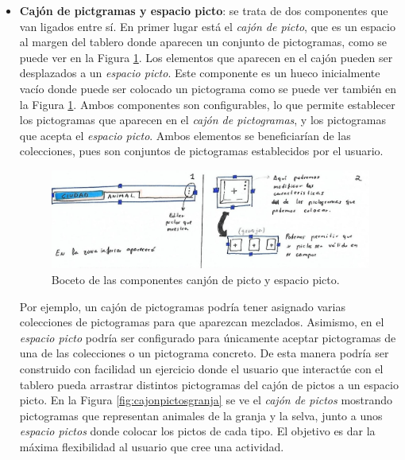 \begin{itemize}
	
	\item \textbf{Cajón de pictgramas y espacio picto}: se trata de dos componentes que van ligados entre sí. En primer lugar está el \textit{cajón de picto}, que es un espacio al margen del tablero donde aparecen un conjunto de pictogramas, como se puede ver en la Figura \ref{fig:componentecajon}. Los elementos que aparecen en el cajón pueden ser desplazados a un \textit{espacio picto}. Este componente es un hueco inicialmente vacío donde puede ser colocado un pictograma como se puede ver también en la Figura \ref{fig:componentecajon}. Ambos componentes son configurables, lo que permite establecer los pictogramas que aparecen en el \textit{cajón de pictogramas}, y los pictogramas que acepta el \textit{espacio picto}. Ambos elementos se beneficiarían de las colecciones, pues son conjuntos de pictogramas establecidos por el usuario.
	
	\begin{figure}[h!]
		\centering
		\includegraphics[width=0.7\linewidth]{Imagenes/Bitmap/componenteCajon}
		\caption{Boceto de las componentes canjón de picto y espacio picto.}
		\label{fig:componentecajon}
	\end{figure}
	
	
	Por ejemplo, un cajón de pictogramas podría tener asignado varias colecciones de pictogramas para que aparezcan mezclados. Asimismo, en el \textit{espacio picto} podría ser configurado para únicamente aceptar pictogramas de una de las colecciones o un pictograma concreto. De esta manera podría ser construido con facilidad un ejercicio donde el usuario que interactúe con el tablero pueda arrastrar distintos pictogramas del cajón de pictos a un espacio picto. En la Figura \ref{fig:cajonpictosgranja} se ve el \textit{cajón de pictos} mostrando pictogramas que representan animales de la granja y la selva, junto a unos \textit{espacio pictos} donde colocar los pictos de cada tipo. El objetivo es dar la máxima flexibilidad al usuario que cree una actividad.
	

\end{itemize}
